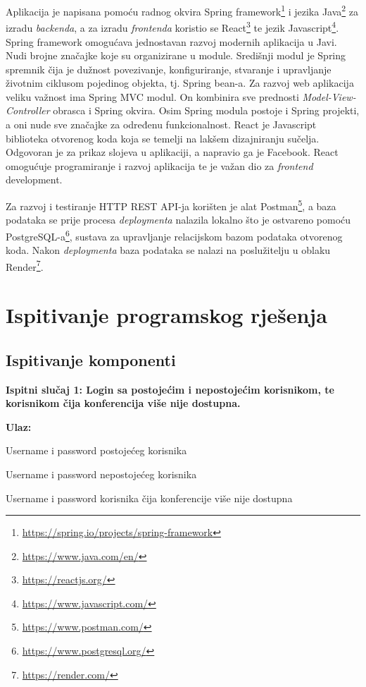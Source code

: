 Aplikacija je napisana pomoću radnog okvira Spring framework\footnote{\url{https://spring.io/projects/spring-framework}} i jezika Java\footnote{\url{https://www.java.com/en/}} za izradu \textit{backenda}, a za izradu \textit{frontenda} koristio se React\footnote{\url{https://reactjs.org/}} te jezik Javascript\footnote{\url{https://www.javascript.com/}}. Spring framework omogućava jednostavan razvoj modernih aplikacija u Javi. Nudi brojne značajke koje su organizirane u module. Središnji modul je Spring spremnik čija je dužnost povezivanje, konfiguriranje, stvaranje i upravljanje životnim ciklusom pojedinog objekta, tj. Spring bean-a. Za razvoj web aplikacija veliku važnost ima Spring MVC modul. On kombinira sve prednosti \textit{Model-View-Controller} obrasca i Spring okvira. Osim Spring modula postoje i Spring projekti, a oni nude sve značajke za određenu funkcionalnost. React je Javascript biblioteka otvorenog koda koja se temelji na lakšem dizajniranju sučelja. Odgovoran je za prikaz slojeva u aplikaciji, a napravio ga je Facebook. React omogućuje programiranje i razvoj aplikacija te je važan dio za  \textit{frontend} development.
	\newline

Za razvoj i testiranje HTTP REST API-ja korišten je alat Postman\footnote{\url{https://www.postman.com/}}, a baza podataka se prije procesa \textit{deploymenta} nalazila lokalno što je ostvareno pomoću PostgreSQL-a\footnote{\url{https://www.postgresql.org/}}, sustava za upravljanje relacijskom bazom podataka otvorenog koda. Nakon \textit{deploymenta} baza podataka se nalazi na poslužitelju u oblaku Render\footnote{\url{https://render.com/}}.
			
			\eject 
		
	
		\section{Ispitivanje programskog rješenja}
			
	
			
			\subsection{Ispitivanje komponenti}

   
			\textbf{Ispitni slučaj 1: Login sa postojećim i nepostojećim korisnikom, te korisnikom čija konferencija više nije dostupna. }
   
   \textbf{Ulaz:}
   \begin{packed_item}
   \item[] \begin{packed_enum}
				
				\item Username i password postojećeg korisnika
    \item Username i password nepostojećeg korisnika
    \item Username i password korisnika čija konferencije više nije dostupna
				
			\end{packed_enum}
   \end{packed_item}

